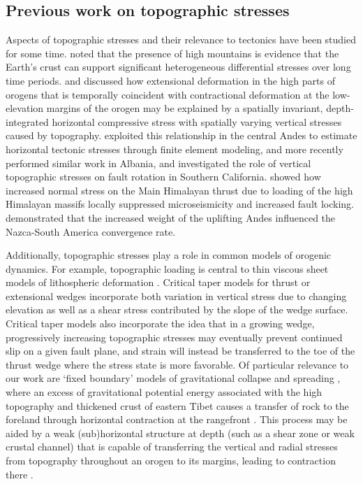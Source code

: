 \documentclass[draft,jgrga]{AGUTeX}
\begin{document}
\begin{article}
\subsection{Previous work on topographic
stresses}\label{previous-work-on-topographic-stresses}

Aspects of topographic stresses and their relevance to tectonics have been
studied for some time. \citet{jeffreys1924} noted that the presence of high
mountains is evidence that the Earth's crust can support significant
heterogeneous differential stresses over long time periods.
\citet{dalmayrac1981} and \citet{molnar1988} discussed how extensional
deformation in the high parts of orogens that is temporally coincident with
contractional deformation at the low-elevation margins of the orogen may be
explained by a spatially invariant, depth-integrated horizontal compressive
stress with spatially varying vertical stresses caused by topography.
\citet{richardson1994} exploited this relationship in the central Andes to
estimate horizontal tectonic stresses through finite element modeling, and more
recently \citet{copley2009} performed similar work in Albania, and
\citet{fialko2005} investigated the role of vertical topographic stresses on
fault rotation in Southern California.
\citet{bollinger2004} showed how increased normal stress on the Main Himalayan
thrust due to loading of the high Himalayan massifs locally suppressed
microseismicity and increased fault locking. \citet{meade2008}
demonstrated that the increased weight of the uplifting Andes influenced the
Nazca-South America convergence rate.

Additionally, topographic stresses play a role in common models of orogenic
dynamics. For example, topographic loading is central to thin viscous sheet
models of lithospheric deformation \citep[e.g.,][]{birdpiper80, flesch2010gpe}.
Critical taper models for thrust or extensional wedges
\citep[e.g.,][]{dahlen1990, xiao1991} incorporate both variation in vertical
stress due to changing elevation as well as a shear stress contributed by the
slope of the wedge surface. Critical taper models also incorporate the idea
that in a growing wedge, progressively increasing topographic stresses may
eventually prevent continued slip on a given fault plane, and strain will
instead be transferred to the toe of the thrust wedge where the stress state is
more favorable. Of particular relevance to our work are `fixed boundary' models
of gravitational collapse and spreading \citep{rey2001}, where an excess of
gravitational potential energy associated with the high topography and
thickened crust of eastern Tibet causes a transfer of rock to the foreland
through horizontal contraction at the rangefront \citep[e.g.,][] {dewey1988,
liuyang2003, copleymckenzie2007}. This process may be aided by a weak
(sub)horizontal structure at depth (such as a shear zone or weak crustal
channel) that is capable of transferring the vertical and radial stresses from
topography throughout an orogen to its margins, leading to contraction there
\citep[e.g.,][]{clark2005, burchfiel2008, fleschbendick2012}.


\end{article}
\end{document}
